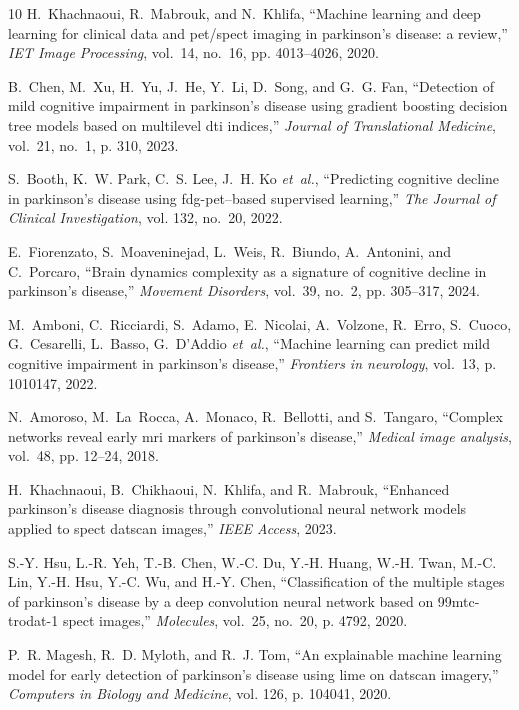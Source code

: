 \documentclass{article}
\begin{document}
\begin{thebibliography}{10}
H.~Khachnaoui, R.~Mabrouk, and N.~Khlifa, ``Machine learning and deep learning
  for clinical data and pet/spect imaging in parkinson's disease: a review,''
  \emph{IET Image Processing}, vol.~14, no.~16, pp. 4013--4026, 2020.

B.~Chen, M.~Xu, H.~Yu, J.~He, Y.~Li, D.~Song, and G.~G. Fan, ``Detection of
  mild cognitive impairment in parkinson’s disease using gradient boosting
  decision tree models based on multilevel dti indices,'' \emph{Journal of
  Translational Medicine}, vol.~21, no.~1, p. 310, 2023.

S.~Booth, K.~W. Park, C.~S. Lee, J.~H. Ko \emph{et~al.}, ``Predicting cognitive
  decline in parkinson’s disease using fdg-pet--based supervised learning,''
  \emph{The Journal of Clinical Investigation}, vol. 132, no.~20, 2022.

E.~Fiorenzato, S.~Moaveninejad, L.~Weis, R.~Biundo, A.~Antonini, and
  C.~Porcaro, ``Brain dynamics complexity as a signature of cognitive decline
  in parkinson's disease,'' \emph{Movement Disorders}, vol.~39, no.~2, pp.
  305--317, 2024.

M.~Amboni, C.~Ricciardi, S.~Adamo, E.~Nicolai, A.~Volzone, R.~Erro, S.~Cuoco,
  G.~Cesarelli, L.~Basso, G.~D'Addio \emph{et~al.}, ``Machine learning can
  predict mild cognitive impairment in parkinson's disease,'' \emph{Frontiers
  in neurology}, vol.~13, p. 1010147, 2022.

N.~Amoroso, M.~La~Rocca, A.~Monaco, R.~Bellotti, and S.~Tangaro, ``Complex
  networks reveal early mri markers of parkinson’s disease,'' \emph{Medical
  image analysis}, vol.~48, pp. 12--24, 2018.

H.~Khachnaoui, B.~Chikhaoui, N.~Khlifa, and R.~Mabrouk, ``Enhanced
  parkinson’s disease diagnosis through convolutional neural network models
  applied to spect datscan images,'' \emph{IEEE Access}, 2023.

S.-Y. Hsu, L.-R. Yeh, T.-B. Chen, W.-C. Du, Y.-H. Huang, W.-H. Twan, M.-C. Lin,
  Y.-H. Hsu, Y.-C. Wu, and H.-Y. Chen, ``Classification of the multiple stages
  of parkinson’s disease by a deep convolution neural network based on
  99mtc-trodat-1 spect images,'' \emph{Molecules}, vol.~25, no.~20, p. 4792,
  2020.

P.~R. Magesh, R.~D. Myloth, and R.~J. Tom, ``An explainable machine learning
  model for early detection of parkinson's disease using lime on datscan
  imagery,'' \emph{Computers in Biology and Medicine}, vol. 126, p. 104041,
  2020.


\end{thebibliography}
\end{document}
